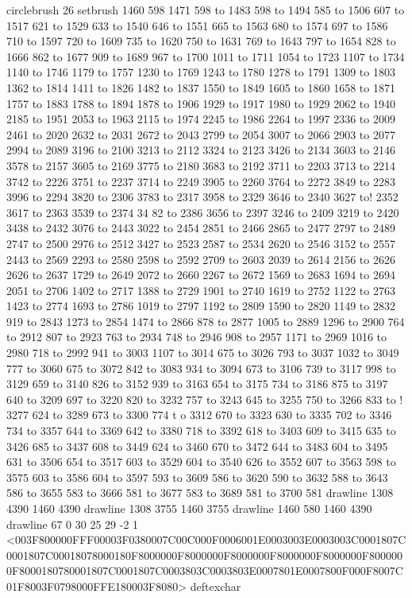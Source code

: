 circlebrush 26 setbrush
1460 598 1471 598 to 1483 598 to 1494 585 to 1506 607 to 1517 621 to 1529 633 to 1540 646 to 1551 665 to 1563 680 to 1574 697 to 1586 710 to 1597 720 to 1609 735 to 1620 750 to 1631 769 to 1643 797 to 1654 828 to 1666 862 to 1677 909 to 1689 967 to 1700 1011 to 1711 1054 to 1723 1107 to 1734 1140 to 1746 1179 to 1757 1230 to 1769 1243 to 1780 1278 to 1791 1309 to 1803 1362 to 1814 1411 to 1826 1482 to 1837 1550 to 1849 1605 to 1860 1658 to 1871 1757 to 1883 1788 to 1894 1878 to 1906 1929 to 1917 1980 to 1929 2062 to 1940 2185 to 1951 2053 to 1963 2115 to 1974 2245 to 1986 2264 to 1997 2336 to 2009 2461 to 2020 2632 to 2031 2672 to 2043 2799 to 2054 3007 to 2066 2903 to 2077 2994 to 2089 3196 to 2100 3213 to 2112 3324 to 2123 3426 to 2134 3603 to 2146 3578 to 2157 3605 to 2169 3775 to 2180 3683 to 2192 3711 to 2203 3713 to 2214 3742 to 2226 3751 to 2237 3714 to 2249 3905 to 2260 3764 to 2272 3849 to 2283 3996 to 2294 3820 to 2306 3783 to 2317 3958 to 2329 3646 to 2340 3627 to!
 2352 3617 to 2363 3539 to 2374 34
82 to 2386 3656 to 2397 3246 to 2409 3219 to 2420 3438 to 2432 3076 to 2443 3022 to 2454 2851 to 2466 2865 to 2477 2797 to 2489 2747 to 2500 2976 to 2512 3427 to 2523 2587 to 2534 2620 to 2546 3152 to 2557 2443 to 2569 2293 to 2580 2598 to 2592 2709 to 2603 2039 to 2614 2156 to 2626 2626 to 2637 1729 to 2649 2072 to 2660 2267 to 2672 1569 to 2683 1694 to 2694 2051 to 2706 1402 to 2717 1388 to 2729 1901 to 2740 1619 to 2752 1122 to 2763 1423 to 2774 1693 to 2786 1019 to 2797 1192 to 2809 1590 to 2820 1149 to 2832 919 to 2843 1273 to 2854 1474 to 2866 878 to 2877 1005 to 2889 1296 to 2900 764 to 2912 807 to 2923 763 to 2934 748 to 2946 908 to 2957 1171 to 2969 1016 to 2980 718 to 2992 941 to 3003 1107 to 3014 675 to 3026 793 to 3037 1032 to 3049 777 to 3060 675 to 3072 842 to 3083 934 to 3094 673 to 3106 739 to 3117 998 to 3129 659 to 3140 826 to 3152 939 to 3163 654 to 3175 734 to 3186 875 to 3197 640 to 3209 697 to 3220 820 to 3232 757 to 3243 645 to 3255 750 to 3266 833 to !
3277 624 to 3289 673 to 3300 774 t
o 3312 670 to 3323 630 to 3335 702 to 3346 734 to 3357 644 to 3369 642 to 3380 718 to 3392 618 to 3403 609 to 3415 635 to 3426 685 to 3437 608 to 3449 624 to 3460 670 to 3472 644 to 3483 604 to 3495 631 to 3506 654 to 3517 603 to 3529 604 to 3540 626 to 3552 607 to 3563 598 to 3575 603 to 3586 604 to 3597 593 to 3609 586 to 3620 590 to 3632 588 to 3643 586 to 3655 583 to 3666 581 to 3677 583 to 3689 581 to 3700 581 drawline
1308 4390 1460 4390 drawline
1308 3755 1460 3755 drawline
1460 580 1460 4390 drawline
67 0 30 25 29 -2 1 {{<003F800000FFF00003F0380007C00C000F0006001E0003003E0003003C0001807C0001807C00018078000180F8000000F8000000F8000000F8000000F8000000F8000000F8000180780001807C0001807C0003803C0003803E0007801E0007800F000F8007C01F8003F0798000FFE180003F8080>}} deftexchar
